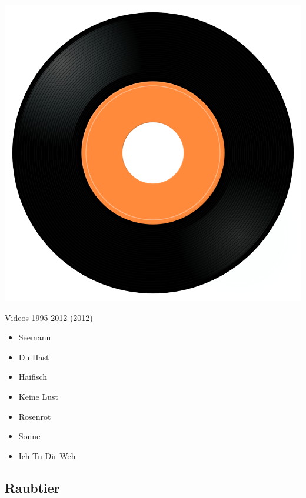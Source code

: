 \begin{minipage}[t]{0.25\textwidth}
\captionsetup{type=figure}
\includegraphics[width=\textwidth]{Images/cover.png}
\caption*{Videos 1995-2012 (2012)}
\end{minipage}
\begin{minipage}[t]{0.25\textwidth}\vspace{0pt}
\begin{itemize}[nosep,leftmargin=1em,labelwidth=*,align=left]
	\setlength{\itemsep}{0pt}
	\item Seemann
	\item Du Hast
	\item Haifisch
	\item Keine Lust
	\item Rosenrot
	\item Sonne
	\item Ich Tu Dir Weh
\end{itemize}
\end{minipage}

\subsection{Raubtier}

